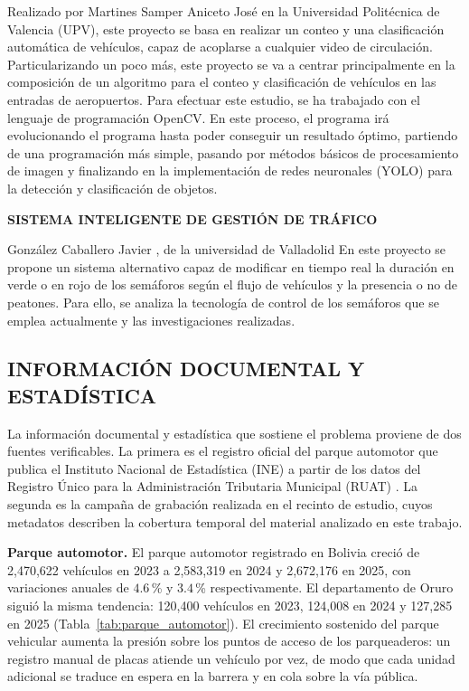 Realizado por Martines Samper Aniceto José \cite{martines2022vehiculos} en la Universidad
Politécnica de Valencia (UPV), este proyecto se basa en realizar un
conteo y una clasificación automática de vehículos, capaz de
acoplarse a cualquier video de circulación. Particularizando un poco
más, este proyecto se va a centrar principalmente en la composición de
un algoritmo para el conteo y clasificación de vehículos en las entradas
de aeropuertos. Para efectuar este estudio, se ha trabajado con el
lenguaje de programación OpenCV. En este proceso, el programa irá evolucionando el programa
hasta poder conseguir un resultado óptimo, partiendo de una programación
más simple, pasando por métodos básicos de procesamiento de imagen y
finalizando en la implementación de redes neuronales (YOLO) para la
detección y clasificación de objetos.

\textbf{SISTEMA INTELIGENTE DE GESTIÓN DE TRÁFICO}

González Caballero Javier \cite{gonzalez2019sistema}, de la universidad
de Valladolid En este proyecto se propone un sistema alternativo capaz
de modificar en tiempo real la duración en verde o en rojo de los
semáforos según el flujo de vehículos y la presencia o no de peatones.
Para ello, se analiza la tecnología de control de los semáforos que
se emplea actualmente y las investigaciones realizadas.

\subsection*{INFORMACIÓN DOCUMENTAL Y ESTADÍSTICA}

La información documental y estadística que sostiene el problema proviene de dos
fuentes verificables. La primera es el registro oficial del parque automotor que
publica el Instituto Nacional de Estadística (INE) a partir de los datos del
Registro Único para la Administración Tributaria Municipal (RUAT)
\cite{ine2026parqueautomotor}. La segunda es la campaña de grabación realizada en
el recinto de estudio, cuyos metadatos describen la cobertura temporal del material
analizado en este trabajo.

\textbf{Parque automotor.} El parque automotor registrado en Bolivia creció de
2,470,622 vehículos en 2023 a 2,583,319 en 2024 y 2,672,176 en 2025, con
variaciones anuales de $4{.}6$\,\% y $3{.}4$\,\% respectivamente. El departamento
de Oruro siguió la misma tendencia: 120,400 vehículos en 2023, 124,008 en 2024
y 127,285 en 2025 (Tabla~\ref{tab:parque_automotor}). El crecimiento sostenido
del parque vehicular aumenta la presión sobre los puntos de acceso de los
parqueaderos: un registro manual de placas atiende un vehículo por vez, de modo que
cada unidad adicional se traduce en espera en la barrera y en cola sobre la vía
pública.

